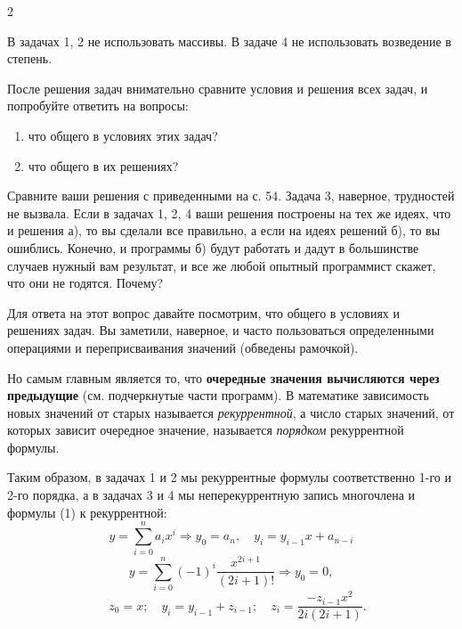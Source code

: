 \begin{multicols}{2}
\begin{enumerate}[label=\bfseries\arabic*., wide=0pt,itemindent = 2em]
	\end{enumerate}

\indent В задачах 1, 2 не использовать массивы. В задаче 4 не использовать возведение в степень.

\vspace{1em}

\indent После решения задач внимательно сравните условия и решения всех задач, и попробуйте ответить на вопросы:


	\begin{enumerate}[itemindent = 1em,label=\arabic*)]
		\item что общего в условиях этих задач?
		\item что общего в их решениях?
	\end{enumerate}

\indent Сравните ваши решения с приведенными на с. 54. Задача 3, наверное, трудностей не вызвала. Если в задачах 1, 2, 4 ваши решения построены на тех же идеях, что и решения а), то вы сделали все правильно, а если на идеях решений б), то вы ошиблись. Конечно, и программы б) будут работать и дадут в большинстве случаев нужный вам результат, и все же любой опытный программист скажет, что они не годятся. Почему?

\indent Для ответа на этот вопрос давайте посмотрим, что общего в условиях и решениях задач. Вы заметили, наверное, и часто пользоваться определенными операциями и переприсваивания значений (обведены рамочкой). \columnbreak 

Но самым главным является то, что \textbf{очередные значения вычисляются через предыдущие} (см. подчеркнутые части программ). В математике зависимость новых значений от старых называется \textit{рекуррентной}, а число старых значений, от которых зависит очередное значение, называется \textit{порядком} рекуррентной формулы.

\indent Таким образом, в задачах 1 и 2 мы  рекуррентные формулы соответственно 1-го и 2-го порядка, а в задачах 3 и 4 мы  неперекуррентную запись многочлена и формулы (1) к рекуррентной:
	\[
		y = \sum_{i=0}^{n} a_i x^i \Rightarrow y_0 = a_n, \quad y_i = y_{i-1} x + a_{n-i}
	\]
	\[
		y = \sum_{i=0}^{n} (-1)^i \frac{x^{2i+1}}{(2i + 1)!} \Rightarrow y_0 = 0, 
	\]
	\[
		\quad z_0 = x; \quad y_i = y_{i-1} + z_{i-1}; \quad z_i = \frac{-z_{i-1}x^2}{2i(2i + 1)}.
	\]
\vspace{1em}


\end{multicols}
